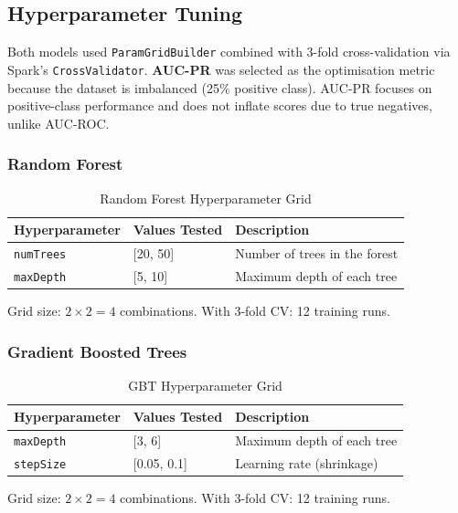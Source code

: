 \subsection{Hyperparameter Tuning}

Both models used \texttt{ParamGridBuilder} combined with 3-fold cross-validation via Spark's \texttt{CrossValidator}. \textbf{AUC-PR} was selected as the optimisation metric because the dataset is imbalanced (25\% positive class). AUC-PR focuses on positive-class performance and does not inflate scores due to true negatives, unlike AUC-ROC.

\subsubsection{Random Forest}

\begin{table}[H]
\centering
\caption{Random Forest Hyperparameter Grid}
\label{tab:rf-grid}
\begin{tabular}{lll}
\toprule
\textbf{Hyperparameter} & \textbf{Values Tested} & \textbf{Description} \\
\midrule
\texttt{numTrees} & [20, 50] & Number of trees in the forest \\
\texttt{maxDepth} & [5, 10] & Maximum depth of each tree \\
\bottomrule
\end{tabular}
\end{table}

Grid size: $2 \times 2 = 4$ combinations. With 3-fold CV: 12 training runs.

\subsubsection{Gradient Boosted Trees}

\begin{table}[H]
\centering
\caption{GBT Hyperparameter Grid}
\label{tab:gbt-grid}
\begin{tabular}{lll}
\toprule
\textbf{Hyperparameter} & \textbf{Values Tested} & \textbf{Description} \\
\midrule
\texttt{maxDepth} & [3, 6] & Maximum depth of each tree \\
\texttt{stepSize} & [0.05, 0.1] & Learning rate (shrinkage) \\
\bottomrule
\end{tabular}
\end{table}

Grid size: $2 \times 2 = 4$ combinations. With 3-fold CV: 12 training runs.


